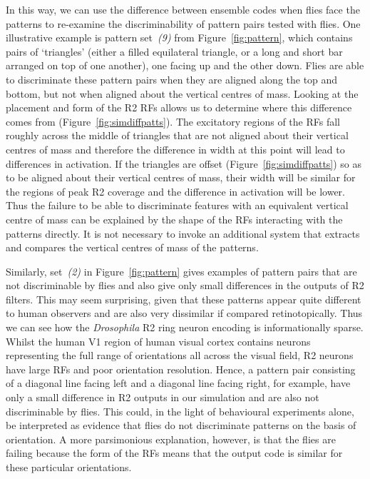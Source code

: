 In this way, we can use the difference between ensemble codes when flies face the patterns to re-examine the discriminability of pattern pairs tested with flies. One illustrative example is pattern set~\emph{(9)} from Figure~\ref{fig:pattern}, which contains pairs of ‘triangles’ (either a filled equilateral triangle, or a long and short bar arranged on top of one another), one facing up and the other down. Flies are able to discriminate these pattern pairs when they are aligned along the top and bottom, but not when aligned about the vertical centres of mass\cite{Ernst1999}. Looking at the placement and form of the R2 \acp{RF} allows us to determine where this difference comes from (Figure~\ref{fig:simdiffpatts}). The excitatory regions of the \acp{RF} fall roughly across the middle of triangles that are not aligned about their vertical centres of mass and therefore the difference in width at this point will lead to differences in activation. If the triangles are offset (Figure~\ref{fig:simdiffpatts}) so as to be aligned about their vertical centres of mass, their width will be similar for the regions of peak R2 coverage and the difference in activation will be lower. Thus the failure to be able to discriminate features with an equivalent vertical centre of mass can be explained by the shape of the \acp{RF} interacting with the patterns directly. It is not necessary to invoke an additional system that extracts and compares the vertical centres of mass of the patterns.

Similarly, set~\emph{(2)} in Figure~\ref{fig:pattern} gives examples of pattern pairs that are not discriminable by flies and also give only small differences in the outputs of R2 filters. This may seem surprising, given that these patterns appear quite different to human observers and are also very dissimilar if compared retinotopically. Thus we can see how the \emph{Drosophila} R2 ring neuron encoding is informationally sparse. Whilst the human V1 region of human visual cortex contains neurons representing the full range of orientations all across the visual field, R2 neurons have large \acp{RF} and poor orientation resolution. Hence, a pattern pair consisting of a diagonal line facing left and a diagonal line facing right, for example, have only a small difference in R2 outputs in our simulation and are also not discriminable by flies. This could, in the light of behavioural experiments alone, be interpreted as evidence that flies do not discriminate patterns on the basis of orientation. A more parsimonious explanation, however, is that the flies are failing because the form of the \acp{RF} means that the output code is similar for these particular orientations.

